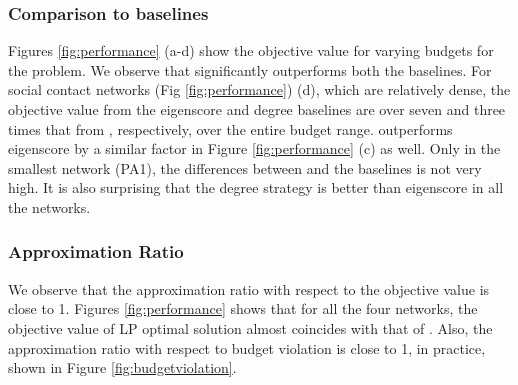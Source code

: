\subsubsection{Comparison to baselines}
Figures \ref{fig:performance} (a-d) show the objective value
for varying budgets for the \probone{} problem. We observe that \algo{} significantly outperforms
both the baselines. For social contact networks (Fig \ref{fig:performance}) (d), which are relatively dense,
the objective value from the eigenscore and degree baselines are over seven and three times that from
\algo{}, respectively, over the entire budget range. \algo{} outperforms eigenscore by a similar factor in Figure \ref{fig:performance} (c) as well.
Only in the smallest network (PA1), the differences between \algo{} and the baselines is not very high.
It is also surprising that the degree strategy is better than eigenscore in all the networks.

\subsubsection{Approximation Ratio}
We observe that the approximation ratio with respect to the objective value is close to 1. Figures \ref{fig:performance} shows that for all the four networks, the objective value of LP optimal solution almost coincides with that of \algo{}. Also, the approximation ratio with respect to budget violation is close to 1, in practice, shown in Figure \ref{fig:budgetviolation}.

%



